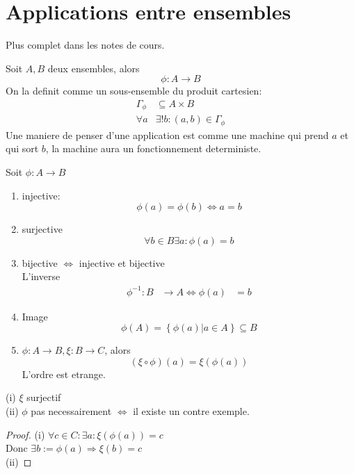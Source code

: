 \documentclass[../main.tex]{subfiles}
\begin{document}
\section{Applications entre ensembles}
Plus complet dans les notes de cours.\\
\begin{defn}\label{defn:formalisation_des_applications}
	Soit $A, B$ deux ensembles, alors 
	\[ 
	\phi : A \to B
	\]
	On la definit comme un sous-ensemble du produit cartesien:
	\begin{align*}
		\Gamma_\phi &\subseteq A \times B\\
		\forall a &\exists ! b: ( a,b) \in \Gamma_\phi
	\end{align*}
	Une maniere de penser d'une application est comme une machine qui prend $a$ et qui sort $b$, la machine aura un fonctionnement deterministe.
\end{defn}
\begin{propr}\label{propr:propriete_des_applications}
	Soit $\phi: A \to B$
	\begin{enumerate}
		\item injective:
			\[ 
				\phi(a) = \phi(b) \iff a=b
			\]
		\item surjective
			\[ 
				\forall b \in B \exists a : \phi(a)=b
			\]
		\item bijective $\iff$ injective et bijective\\
			L'inverse
			\begin{align*}
				\phi^{-1}: B &\to A
				\iff \phi(a) &= b
			\end{align*}
			
		\item Image
			\[ 
				\phi(A) = \left\{ \phi(a) \vert a \in A \right\} \subseteq B
			\]
		\item $\phi: A \to B, \xi :B \to C$, alors
			\[ 
				( \xi \circ \phi )(a) = \xi(\phi(a))
			\]
			L'ordre est etrange.
	\end{enumerate}
\end{propr}
\begin{propo}\label{propo:surjectivite_de_la_composition}
	(i) $\xi$ surjectif\\
	(ii) $\phi$ pas necessairement $\iff$ il existe un contre exemple.
\end{propo}
\begin{proof}
	(i) $\forall c \in C: \exists a: \xi(\phi(a))=c$\\
	Donc $\exists b :=\phi(a) \Rightarrow \xi(b)=c$\\
	(ii) 
\end{proof}
\end{document}
